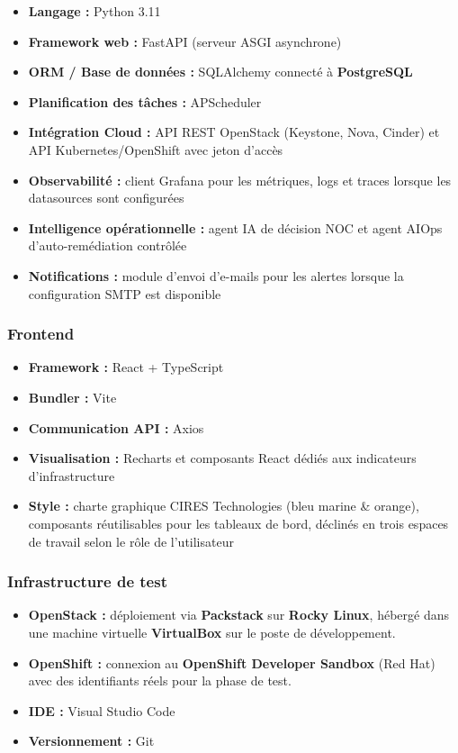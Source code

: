 \documentclass[11pt,a4paper]{report}
\begin{document}
\begin{itemize}
  \item \textbf{Langage :} Python 3.11
  \item \textbf{Framework web :} FastAPI (serveur ASGI asynchrone)
  \item \textbf{ORM / Base de données :} SQLAlchemy connecté à
    \textbf{PostgreSQL}
  \item \textbf{Planification des tâches :} APScheduler
  \item \textbf{Intégration Cloud :} API REST OpenStack (Keystone, Nova,
    Cinder) et API Kubernetes/OpenShift avec jeton d'accès
  \item \textbf{Observabilité :} client Grafana pour les métriques, logs et
    traces lorsque les datasources sont configurées
  \item \textbf{Intelligence opérationnelle :} agent IA de décision NOC et
    agent AIOps d'auto-remédiation contrôlée
  \item \textbf{Notifications :} module d'envoi d'e-mails pour les alertes
    lorsque la configuration SMTP est disponible
\end{itemize}

\subsubsection*{Frontend}

\begin{itemize}
  \item \textbf{Framework :} React + TypeScript
  \item \textbf{Bundler :} Vite
  \item \textbf{Communication API :} Axios
  \item \textbf{Visualisation :} Recharts et composants React dédiés aux
    indicateurs d'infrastructure
  \item \textbf{Style :} charte graphique CIRES Technologies (bleu marine \&
    orange), composants réutilisables pour les tableaux de bord, déclinés en
    trois espaces de travail selon le rôle de l'utilisateur
\end{itemize}

\subsubsection*{Infrastructure de test}

\begin{itemize}
  \item \textbf{OpenStack :} déploiement via \textbf{Packstack} sur
    \textbf{Rocky Linux}, hébergé dans une machine virtuelle
    \textbf{VirtualBox} sur le poste de développement.
  \item \textbf{OpenShift :} connexion au \textbf{OpenShift Developer
    Sandbox} (Red Hat) avec des identifiants réels pour la phase de test.
  \item \textbf{IDE :} Visual Studio Code
  \item \textbf{Versionnement :} Git
\end{itemize}
\end{document}
